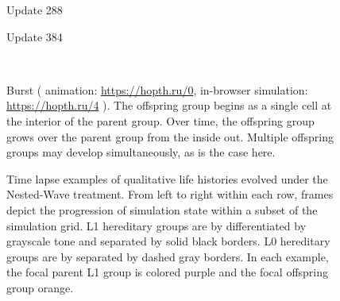 \begin{figure*}[!htbp]
\begin{center}
\begin{minipage}[b]{\textwidth}
\begin{minipage}[t]{0.18\textwidth}
{\footnotesize Update 288}
\end{minipage}
\begin{minipage}[t]{0.18\textwidth}
\centering
{}
{\footnotesize Update 384}
\end{minipage}\\
\begin{minipage}{\textwidth}
\dissertationonly{\footnotesize}
 Burst
(%
animation: \url{https://hopth.ru/0},
in-browser simulation: \url{https://hopth.ru/4}%
).
The offspring group begins as a single cell at the interior of the parent group.
Over time, the offspring group grows over the parent group from the inside out.
Multiple offspring groups may develop simultaneously, as is the case here.
\end{minipage}
\end{minipage}

\caption{
Time lapse examples of qualitative life histories evolved under the Nested-Wave treatment.
From left to right within each row, frames depict the progression of simulation state within a subset of the simulation grid.
L1 hereditary groups are by differentiated by grayscale tone and separated by solid black borders.
L0 hereditary groups are by separated by dashed gray borders.
In each example, the focal parent L1 group is colored purple and the focal offspring group orange.
}
\label{fig:lifecycle}
\end{center}
\end{figure*}

